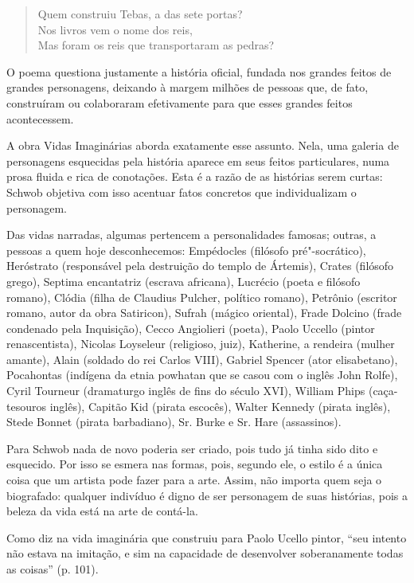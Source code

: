 \documentclass[12pt]{extarticle}
\begin{document}
\begin{verse}
Quem construiu Tebas, a das sete portas?\\
Nos livros vem o nome dos reis,\\
Mas foram os reis que transportaram as pedras?\\
\end{verse}

O poema questiona justamente a história oficial, fundada nos grandes
feitos de grandes personagens, deixando à margem milhões de pessoas que,
de fato, construíram ou colaboraram efetivamente para que esses grandes
feitos acontecessem.

A obra Vidas Imaginárias aborda exatamente esse assunto. Nela, uma
galeria de personagens esquecidas pela história aparece em seus feitos
particulares, numa prosa fluida e rica de conotações. Esta é a razão de
as histórias serem curtas: Schwob objetiva com isso acentuar fatos
concretos que individualizam o personagem.

Das vidas narradas, algumas pertencem a personalidades famosas; outras,
a pessoas a quem hoje desconhecemos: Empédocles (filósofo
pré"-socrático), Heróstrato (responsável pela destruição do templo de
Ártemis), Crates (filósofo grego), Septima encantatriz (escrava
africana), Lucrécio (poeta e filósofo romano), Clódia (filha de Claudius
Pulcher, político romano), Petrônio (escritor romano, autor da obra
Satiricon), Sufrah (mágico oriental), Frade Dolcino (frade condenado
pela Inquisição), Cecco Angiolieri (poeta), Paolo Uccello (pintor
renascentista), Nicolas Loyseleur (religioso, juiz), Katherine, a
rendeira (mulher amante), Alain (soldado do rei Carlos VIII), Gabriel
Spencer (ator elisabetano), Pocahontas (indígena da etnia powhatan que
se casou com o inglês John Rolfe), Cyril Tourneur (dramaturgo inglês de
fins do século XVI), William Phips (caça-tesouros inglês), Capitão Kid
(pirata escocês), Walter Kennedy (pirata inglês), Stede Bonnet (pirata
barbadiano), Sr. Burke e Sr. Hare (assassinos).

Para Schwob nada de novo poderia ser criado, pois tudo já tinha sido
dito e esquecido. Por isso se esmera nas formas, pois, segundo ele, o
estilo é a única coisa que um artista pode fazer para a arte. Assim, não
importa quem seja o biografado: qualquer indivíduo é digno de ser
personagem de suas histórias, pois a beleza da vida está na arte de
contá-la.

Como diz na vida imaginária que construiu para Paolo Ucello pintor,
``seu intento não estava na imitação, e sim na capacidade de desenvolver
soberanamente todas as coisas'' (p. 101).
\end{document}
